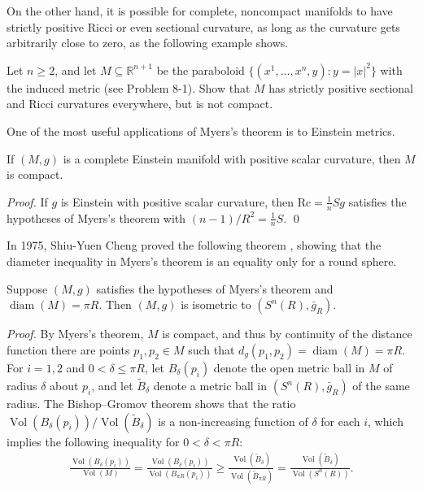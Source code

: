 On the other hand, it is possible for complete, noncompact manifolds to have strictly positive Ricci or even sectional curvature, as long as the curvature gets arbitrarily close to zero, as the following example shows.

\begin{exercise}
\label{exer:paraboloid-positive-curvature}
Let $n \geq 2$, and let $M \subseteq \mathbb{R}^{n+1}$ be the paraboloid $\{(x^1, \ldots, x^n, y) : y = |x|^2\}$ with the induced metric (see Problem 8-1). Show that $M$ has strictly positive sectional and Ricci curvatures everywhere, but is not compact.
\end{exercise}

One of the most useful applications of Myers's theorem is to Einstein metrics.

\begin{corollary}
\label{cor:einstein-positive-scalar-curvature-compact}
If $(M,g)$ is a complete Einstein manifold with positive scalar curvature, then $M$ is compact.
\end{corollary}

\emph{Proof.} If $g$ is Einstein with positive scalar curvature, then $\text{Rc} = \frac{1}{n}Sg$ satisfies the hypotheses of Myers's theorem with $(n-1)/R^2 = \frac{1}{n}S$. \qed

In 1975, Shiu-Yuen Cheng proved the following theorem \cite{Che75}, showing that the diameter inequality in Myers's theorem is an equality only for a round sphere.

\begin{theorem}
\label{thm:chengs-maximal-diameter}
Suppose $(M, g)$ satisfies the hypotheses of Myers's theorem and $\operatorname{diam}(M) = \pi R$. Then $(M, g)$ is isometric to $(S^n(R), \bar{g}_R)$.
\end{theorem}

\emph{Proof.} By Myers's theorem, $M$ is compact, and thus by continuity of the distance function there are points $p_1, p_2 \in M$ such that $d_g(p_1, p_2) = \operatorname{diam}(M) = \pi R$. For $i = 1, 2$ and $0 < \delta \leq \pi R$, let $B_\delta(p_i)$ denote the open metric ball in $M$ of radius $\delta$ about $p_i$, and let $\tilde{B}_\delta$ denote a metric ball in $(S^n(R), \bar{g}_R)$ of the same radius. The Bishop--Gromov theorem shows that the ratio $\operatorname{Vol}(B_\delta(p_i))/\operatorname{Vol}(\tilde{B}_\delta)$ is a non-increasing function of $\delta$ for each $i$, which implies the following inequality for $0 < \delta < \pi R$:
\begin{align}
\frac{\operatorname{Vol}(B_\delta(p_i))}{\operatorname{Vol}(M)} = \frac{\operatorname{Vol}(B_\delta(p_i))}{\operatorname{Vol}(B_{\pi R}(p_i))} \geq \frac{\operatorname{Vol}(\tilde{B}_\delta)}{\operatorname{Vol}(\tilde{B}_{\pi R})} = \frac{\operatorname{Vol}(\tilde{B}_\delta)}{\operatorname{Vol}(S^n(R))}.
\label{eq:12.2}
\end{align}

